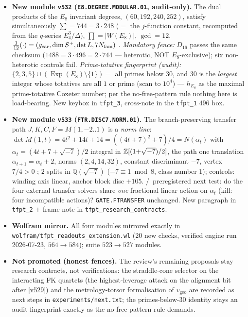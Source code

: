 \begin{itemize}[leftmargin=1.5em]
clock as \emph{one integer operator}); Ramanujan trace tomography $\operatorname{tr}(T_{30}^k)=c_{30}(k)
=c_5(k)c_6(k)$ for all $k$, signed table $(-1,1,2,4,-2,-4,-8,8)$, atom readout $(2,4,8)=
(|\Z_2|,|\mu_4|,\operatorname{rank}E_8)$; honest kill scope ($\Phi_{15}$ passes the unsigned triple ---
the \emph{signed} table discriminates; $\Phi_{16}/\Phi_{20}/\Phi_{24}$ die on the triple). The flip-atlas
intertwiner (\texttt{COX.FLIP.INTERTWINER}) and Stage B stay \mO; \texttt{tfpt\_1} Stage A prose updated.
\item \textbf{New module \texttt{v532} (\texttt{E8.DEGREE.MODULAR.01}, audit-only).} The dual products of the
$E_8$ invariant degrees, $(60,192,240,252)$, satisfy simultaneously $\sum=744=3\cdot248$ ($=$ the
$j$-function constant, recomputed from the $q$-series $E_4^3/\Delta$), $\prod=|W(E_8)|$, $\gcd=12$,
$\tfrac1{12}(\cdot)=(g_{\mathrm{car}},\dim S^+,\det L,7N_{\mathrm{fam}})$ \mE. \emph{Mandatory fence:} $D_{16}$ passes the same
checksum ($1488=3\cdot496=2\cdot744$ --- heterotic, NOT $E_8$-exclusive); six non-heterotic controls fail.
\emph{Prime-totative fingerprint (audit):} $\{2,3,5\}\cup(\operatorname{Exp}(E_8)\setminus\{1\})=$ all
primes below $30$, and $30$ is the \emph{largest} integer whose totatives are all $1$ or prime (scan to
$10^4$) --- $h_{E_8}$ as the maximal prime-totative Coxeter number; per the no-free-pattern rule nothing
here is load-bearing. New keybox in \texttt{tfpt\_3}, cross-note in the \texttt{tfpt\_1} $496$ box.
\item \textbf{New module \texttt{v533} (\texttt{FTR.DISC7.NORM.01}).} The branch-preserving transfer path
$J,K,C,F=M(1,-2..1)$ is a \emph{norm line}: $\det M(1,t)=4t^2{+}14t{+}14=((4t{+}7)^2{+}7)/4
=N(\alpha_t)$ with $\alpha_t=(4t{+}7{+}\sqrt{-7})/2$ integral in $\mathbb{Z}[(1{+}\sqrt{-7})/2]$, the path one
translation $\alpha_{t+1}=\alpha_t+2$, norms $(2,4,14,32)$, constant discriminant $-7$, vertex $7/4>0$
\mE; $2$ splits in $\mathbb Q(\sqrt{-7})$ ($-7\equiv1\bmod8$, class number $1$); controls: winding axis linear,
anchor block disc $+105$. \mC/\mO\ preregistered next test: do the four external transfer solvers share
\emph{one} fractional-linear action on $\alpha_t$ (kill: four incompatible actions)?
\texttt{GATE.FTRANSFER} unchanged. New paragraph in \texttt{tfpt\_2} $+$ frame note in
\texttt{tfpt\_research\_contracts}.
\item \textbf{Wolfram mirror.} All four modules mirrored exactly in
\texttt{wolfram/tfpt\_readouts\_extension.wl} ($20$ new checks, verified engine run 2026-07-23,
$564\to584$); suite $523\to527$ modules.
\item \textbf{Not promoted (honest fences).} The review's remaining proposals stay research contracts, not
verifications: the straddle-cone selector on the interacting FK quartets (the highest-leverage attack on
the alignment bit after \vref{v529}) and the metrology-torsor formalisation of $v_{\mathrm{geo}}$ are
recorded as next steps in \texttt{experiments/next.txt}; the primes-below-$30$ identity stays an audit
fingerprint exactly as the no-free-pattern rule demands.
\end{itemize}

